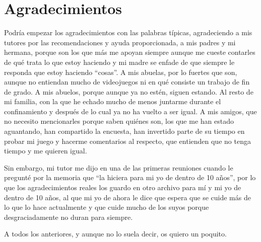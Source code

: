 \documentclass[12pt, a4paper,twoside,titlepage]{book}
\let\origdoublepage\cleardoublepage
\renewcommand{\cleardoublepage}{\clearpage{\pagestyle{empty}\origdoublepage}}
\begin{document}
\chapter*{Agradecimientos}

Podría empezar los agradecimientos con las palabras típicas, agradeciendo a mis tutores por las recomendaciones y ayuda proporcionada, a mis padres y mi hermana, porque son los que más me apoyan siempre aunque me cueste contarles de qué trata lo que estoy haciendo y mi madre se enfade de que siempre le responda que estoy haciendo ``cosas''. A mis abuelas, por lo fuertes que son, aunque no entiendan mucho de videojuegos ni en qué consiste un trabajo de fin de grado. A mis abuelos, porque aunque ya no estén, siguen estando. Al resto de mi familia, con la que he echado mucho de menos juntarme durante el confinamiento y después de lo cual ya no ha vuelto a ser igual. A mis amigos, que no necesito mencionarles porque saben quiénes son, los que me han estado aguantando, han compartido la encuesta, han invertido parte de su tiempo en probar mi juego y hacerme comentarios al respecto, que entienden que no tenga tiempo y me quieren igual.

Sin embargo, mi tutor me dijo en una de las primeras reuniones cuando le pregunté por la memoria que ``la hiciera para mi yo de dentro de 10 años'', por lo que los agradecimientos reales los guardo en otro archivo para mí y mi yo de dentro de 10 años, al que mi yo de ahora le dice que espera que se cuide más de lo que lo hace actualmente y que cuide mucho de los suyos porque desgraciadamente no duran para siempre. 

A todos los anteriores, y aunque no lo suela decir, os quiero un poquito.  


{
  \setlength{\parskip}{1pt}

  \cleardoublepage
  \tableofcontents

  \cleardoublepage
  \listoftables

  \cleardoublepage
  \listoffigures
}


\cleardoublepage
{}
\setcounter{page}{1}
\end{document}

